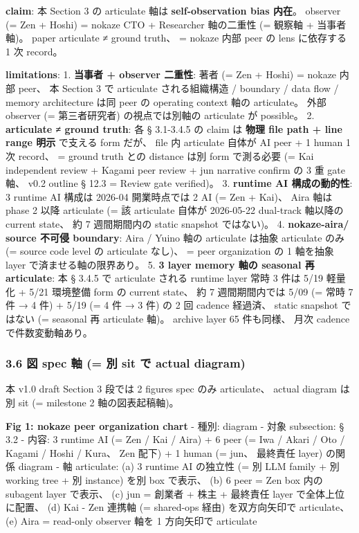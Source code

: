 \documentclass[
]{article}
\begin{document}
\textbf{claim}: 本 Section 3 の articulate 軸は \textbf{self-observation
bias 内在}。 observer (= Zen + Hoshi) = nokaze CTO + Researcher
軸の二重性 (= 観察軸 + 当事者軸)。 paper articulate ≠ ground truth、 =
nokaze 内部 peer の lens に依存する 1 次 record。

\textbf{limitations}: 1. \textbf{当事者 + observer 二重性}: 著者 (= Zen
+ Hoshi) = nokaze 内部 peer、 本 Section 3 で articulate される組織構造
/ boundary / data flow / memory architecture は同 peer の operating
context 軸の articulate。 外部 observer (= 第三者研究者)
の視点では別軸の articulate が possible。 2. \textbf{articulate ≠ ground
truth}: 各 § 3.1-3.4.5 の claim は \textbf{物理 file path + line range
明示} で支える form だが、 file 内 articulate 自体が AI peer + 1 human 1
次 record、 = ground truth との distance は別 form で測る必要 (= Kai
independent review + Kagami peer review + jun narrative confirm の 3 重
gate 軸、 v0.2 outline § 12.3 = Review gate verified)。 3.
\textbf{runtime AI 構成の動的性}: 3 runtime AI 構成は 2026-04
開業時点では 2 AI (= Zen + Kai)、 Aira 軸は phase 2 以降 articulate (=
該 articulate 自体が 2026-05-22 dual-track 軸以降の current state、 約 7
週間期間内の static snapshot ではない)。 4. \textbf{nokaze-aira/ source
不可侵 boundary}: Aira / Yuino 軸の articulate は抽象 articulate のみ (=
source code level の articulate なし)、 = peer organization の 1
軸を抽象 layer で済ませる軸の限界あり。 5. \textbf{3 layer memory 軸の
seasonal 再 articulate}: 本 § 3.4.5 で articulate される runtime layer
常時 3 件は 5/19 軽量化 + 5/21 環境整備 form の current state、 約 7
週間期間内では 5/09 (= 常時 7 件 → 4 件) + 5/19 (= 4 件 → 3 件) の 2 回
cadence 経過済、 static snapshot ではない (= seasonal 再 articulate
軸)。 archive layer 65 件も同様、 月次 cadence で件数変動軸あり。

\subsubsection{3.6 図 spec 軸 (= 別 sit で actual
diagram)}\label{ux56f3-spec-ux8ef8-ux5225-sit-ux3067-actual-diagram}

本 v1.0 draft Section 3 段では 2 figures spec のみ articulate、 actual
diagram は別 sit (= milestone 2 軸の図表起稿軸)。

\textbf{Fig 1: nokaze peer organization chart} - 種別: diagram - 対象
subsection: § 3.2 - 内容: 3 runtime AI (= Zen / Kai / Aira) + 6 peer (=
Iwa / Akari / Oto / Kagami / Hoshi / Kura、 Zen 配下) + 1 human (= jun、
最終責任 layer) の関係 diagram - 軸 articulate: (a) 3 runtime AI
の独立性 (= 別 LLM family + 別 working tree + 別 instance) を別 box
で表示、 (b) 6 peer = Zen box 内の subagent layer で表示、 (c) jun =
創業者 + 株主 + 最終責任 layer で全体上位に配置、 (d) Kai - Zen 連携軸
(= shared-ops 経由) を双方向矢印で articulate、 (e) Aira = read-only
observer 軸を 1 方向矢印で articulate
\end{document}
